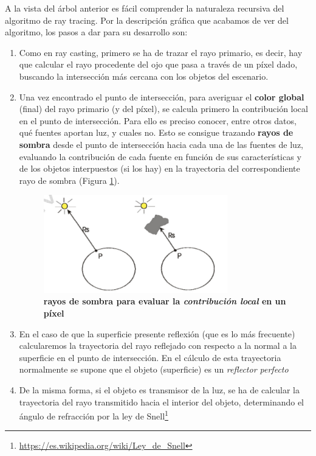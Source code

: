 A la vista del árbol anterior es fácil comprender la naturaleza recursiva del algoritmo de ray tracing. Por la descripción gráfica que acabamos de ver del algoritmo, los pasos a dar para su desarrollo son:
\begin{enumerate}
    \item Como en ray casting, primero se ha de trazar el rayo primario, es decir, hay que calcular el rayo procedente del ojo que pasa a través de un píxel dado, buscando la intersección más cercana con los objetos del escenario.
\item Una vez encontrado el punto de intersección, para averiguar el \textbf{color global} (final) del rayo primario (y del píxel), se calcula primero la contribución local en el punto de intersección. Para ello es preciso conocer, entre otros datos, qué fuentes aportan luz, y cuales no. Esto se consigue trazando \textbf{rayos de sombra} desde el punto de intersección hacia cada una de las fuentes de luz, evaluando la contribución de cada fuente en función de sus características y de los objetos interpuestos (si los hay) en la trayectoria del correspondiente rayo de sombra (Figura \ref{fig:grafica12a}).
\begin{figure}[h]
    \includegraphics[width=8cm]{Img/CPD/grafica12a.jpg}
    \centering
    \caption{\textbf{\footnotesize{  rayos de sombra para evaluar la \textit{contribución local} en un píxel   }}}
    \label{fig:grafica12a}
\end{figure}
\item En el caso de que la superficie presente reflexión (que es lo más frecuente) calcularemos la trayectoria del rayo reflejado con respecto a la normal a la superficie en el punto de intersección. En el cálculo de esta trayectoria normalmente se supone que el objeto (superficie) es un \textit{reflector perfecto}

\item De la misma forma, si el objeto es transmisor de la luz, se ha de calcular la trayectoria del rayo transmitido hacia el interior del objeto, determinando el ángulo de refracción por la ley de Snell\footnote{\url{https://es.wikipedia.org/wiki/Ley_de_Snell}}
\end{enumerate}


